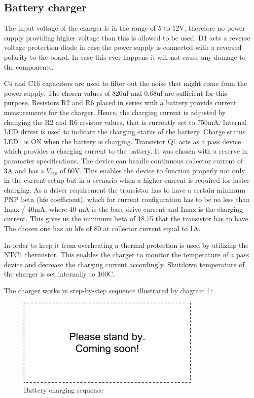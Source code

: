 \subsection{Battery charger}
The input voltage of the charger is in the range of 5 to 12V, therefore no power supply providing higher voltage than this is allowed to be used. D1 acts a reverse voltage protection diode in case the power supply is connected with a reversed polarity to the board. In case this ever happens it will not cause any damage to the components. 

C4 and C16 capacitors are used to filter out the noise that might come from the power supply. The chosen values of 820uf and 0.68uf are sufficient for this purpose. Resistors R2 and R6 placed in series with a battery provide current measurements for the charger. Hence, the charging current is adjusted by changing the R2 and R6 resistor values, that is currently set to 750mA. Internal LED driver is used to indicate the charging status of the battery. Charge status LED1 is ON when the battery is charging. Transistor Q1 acts as a pass device which provides a charging current to the battery. It was chosen with a reserve in parameter specifications. The device can handle continuous collector current of 3A and has a $V_{ceo}$ of 60V. This enables the device to function properly not only in the current setup but in a scenario when a higher current is required for faster charging. As a driver requirement the transistor has to have a certain minimum PNP beta (hfe coefficient), which for current configuration has to be no less than Imax / 40mA, where 40 mA is the base drive current and Imax is the charging current. This gives us the minimum beta of 18.75 that the transistor has to have. The chosen one has an hfe of 80 at collector current equal to 1A. 

In order to keep it from overheating a thermal protection is used by utilizing the NTC1 thermistor. This enables the charger to monitor the temperature of a pass device and decrease the charging current accordingly. Shutdown temperature of the charger is set internally to 100C. 

The charger works in step-by-step sequence illustrated by diagram \ref{fig:charger_sequence}:

\begin{figure}
\centering
\includegraphics[width=0.8\textwidth]{Images/dummy}
\caption{Battery charging sequence}
\label{fig:charger_sequence}
\end{figure}

